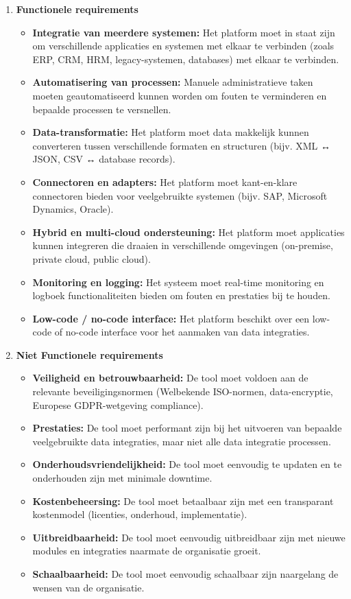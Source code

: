 \begin{enumerate}
    \item \textbf{Functionele requirements}
    \begin{itemize}
        \item \textbf{Integratie van meerdere systemen:} Het platform moet in staat zijn om verschillende applicaties en systemen met elkaar te verbinden (zoals ERP, CRM, HRM, legacy-systemen, databases) met elkaar te verbinden.
        \item \textbf{Automatisering van processen:} Manuele administratieve taken moeten geautomatiseerd kunnen worden om fouten te verminderen en bepaalde processen te versnellen.
        \item \textbf{Data-transformatie:} Het platform moet data makkelijk kunnen converteren tussen verschillende formaten en structuren (bijv. XML ↔ JSON, CSV ↔ database records).
        \item \textbf{Connectoren en adapters:} Het platform moet kant-en-klare connectoren bieden voor veelgebruikte systemen (bijv. SAP, Microsoft Dynamics, Oracle).
        \item \textbf{Hybrid en multi-cloud ondersteuning:} Het platform moet applicaties kunnen integreren die draaien in verschillende omgevingen (on-premise, private cloud, public cloud).
        \item \textbf{Monitoring en logging:} Het systeem moet real-time monitoring en logboek functionaliteiten bieden om fouten en prestaties bij te houden.
        \item \textbf{Low-code / no-code interface:} Het platform beschikt over een low-code of no-code interface voor het aanmaken van data integraties.
    \end{itemize}

    \item \textbf{Niet Functionele requirements}
    \begin{itemize}
        \item \textbf{Veiligheid en betrouwbaarheid:} De tool moet voldoen aan de relevante beveiligingsnormen (Welbekende ISO-normen, data-encryptie, Europese GDPR-wetgeving compliance).
        \item \textbf{Prestaties:} De tool moet performant zijn bij het uitvoeren van bepaalde veelgebruikte data integraties, maar niet alle data integratie processen.
        \item \textbf{Onderhoudsvriendelijkheid:} De tool moet eenvoudig te updaten en te onderhouden zijn met minimale downtime.
        \item \textbf{Kostenbeheersing:} De tool moet betaalbaar zijn met een transparant kostenmodel (licenties, onderhoud, implementatie).
        \item \textbf{Uitbreidbaarheid:} De tool moet eenvoudig uitbreidbaar zijn met nieuwe modules en integraties naarmate de organisatie groeit.
        \item \textbf{Schaalbaarheid:} De tool moet eenvoudig schaalbaar zijn naargelang de wensen van de organisatie.
    \end{itemize}
\end{enumerate}

